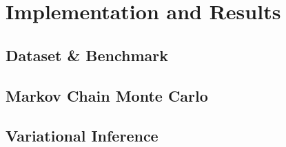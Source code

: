 \chapter{Implementation and Results}



\section{Dataset \& Benchmark}
\section{Markov Chain Monte Carlo}
\section{Variational Inference}